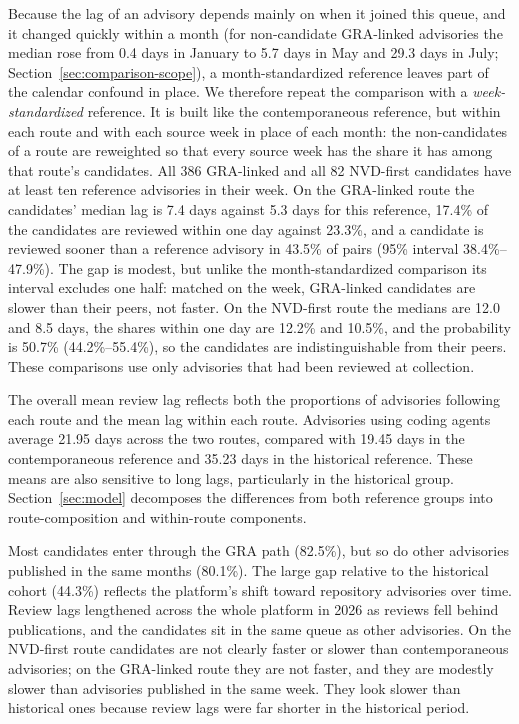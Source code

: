 \documentclass[smallextended,natbib]{svjour3}
\begin{document}
Because the lag of an advisory depends mainly on when it joined this queue, and
it changed quickly within a month (for non-candidate GRA-linked advisories the
median rose from 0.4 days in January to 5.7 days in May and 29.3 days in July;
Section~\ref{sec:comparison-scope}), a month-standardized reference leaves part
of the calendar confound in place.  We therefore repeat the comparison with a
\emph{week-standardized} reference.  It is built like the contemporaneous
reference, but within each route and with each source week in place of each
month: the non-candidates of a route are reweighted so that every source week
has the share it has among that route's candidates.  All 386 GRA-linked and all
82 NVD-first candidates have at least ten reference advisories in their week.
On the GRA-linked route the candidates' median lag is 7.4 days against 5.3 days
for this reference, 17.4\% of the candidates are reviewed within one day against
23.3\%, and a candidate is reviewed sooner than a reference advisory in 43.5\%
of pairs (95\% interval 38.4\%--47.9\%).  The gap is modest, but unlike the
month-standardized comparison its interval excludes one half: matched on the
week, GRA-linked candidates are slower than their peers, not faster.  On the
NVD-first route the medians are 12.0 and 8.5 days, the shares within one day are
12.2\% and 10.5\%, and the probability is 50.7\% (44.2\%--55.4\%), so the
candidates are indistinguishable from their peers.  These comparisons use only
advisories that had been reviewed at collection. 


The overall mean review lag reflects both the proportions of advisories
following each route and the mean lag within each route. Advisories using
coding agents average 21.95 days across the two routes, compared with 19.45
days in the contemporaneous reference and 35.23 days in the historical
reference. These means are also sensitive to long lags, particularly in the
historical group. Section~\ref{sec:model} decomposes the differences from both
reference groups into route-composition and within-route components.

\begin{resultbox}
Most candidates enter through the GRA path (82.5\%), but so do other
advisories published in the same months (80.1\%).  The large gap relative to
the historical cohort (44.3\%) reflects the platform's shift toward repository
advisories over time.  Review
lags lengthened across the whole platform in 2026 as reviews fell behind
publications, and the candidates sit in the same queue as other advisories.  On
the NVD-first route candidates are not clearly faster or slower than
contemporaneous advisories; on the GRA-linked route they are not faster, and
they are modestly slower than advisories published in the same week.  They look
slower than historical ones because review lags were far shorter in the
historical period.
\end{resultbox}
 
\end{document}
